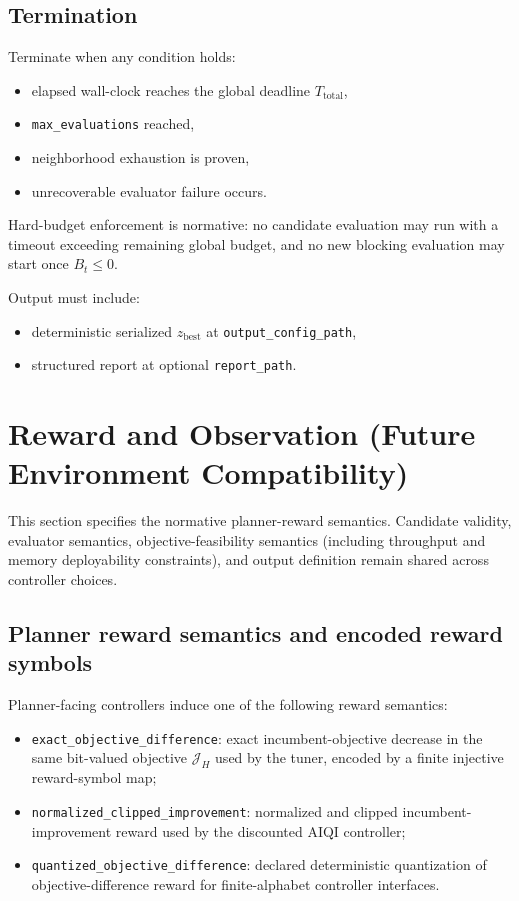 \documentclass[11pt]{article}
\begin{document}
\subsection{Termination}

Terminate when any condition holds:
\begin{itemize}
    \item elapsed wall-clock reaches the global deadline
    $T_{\mathrm{total}}$,
    \item \texttt{max\_evaluations} reached,
    \item neighborhood exhaustion is proven,
    \item unrecoverable evaluator failure occurs.
\end{itemize}

Hard-budget enforcement is normative: no candidate evaluation may run with a
timeout exceeding remaining global budget, and no new blocking evaluation may
start once $B_t\le 0$.

Output must include:
\begin{itemize}
    \item deterministic serialized $z_{\mathrm{best}}$ at \texttt{output\_config\_path},
    \item structured report at optional \texttt{report\_path}.
\end{itemize}

\section{Reward and Observation (Future Environment Compatibility)}\label{sec:reward-observation}

This section specifies the normative planner-reward semantics.
Candidate validity, evaluator semantics, objective-feasibility semantics
(including throughput and memory deployability constraints), and output
definition remain shared across controller choices.

\subsection{Planner reward semantics and encoded reward symbols}

Planner-facing controllers induce one of the following reward semantics:
\begin{itemize}
    \item \texttt{exact\_objective\_difference}: exact incumbent-objective
    decrease in the same bit-valued objective $\mathcal{J}_H$ used by the tuner,
    encoded by a finite injective reward-symbol map;
    \item \texttt{normalized\_clipped\_improvement}: normalized and clipped
    incumbent-improvement reward used by the discounted AIQI controller;
    \item \texttt{quantized\_objective\_difference}: declared deterministic
    quantization of objective-difference reward for finite-alphabet controller
    interfaces.
\end{itemize}
\end{document}
